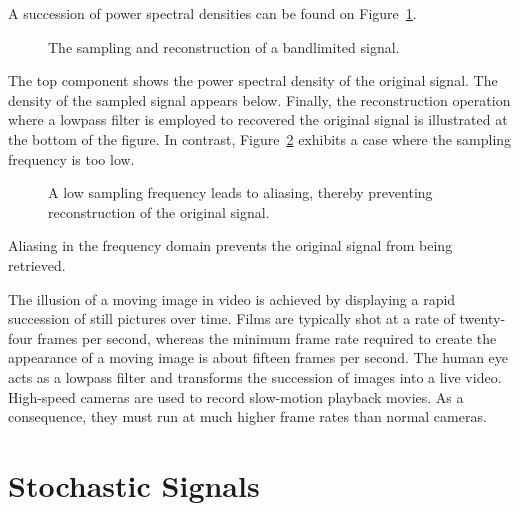 A succession of power spectral densities can be found on Figure~\ref{figure:Sampling}.
\begin{figure}[htbp]
\begin{center}
\caption{The sampling and reconstruction of a bandlimited signal.}
\label{figure:Sampling}
\end{center}
\end{figure}
The top component shows the power spectral density of the original signal.
The density of the sampled signal appears below.
Finally, the reconstruction operation where a lowpass filter is employed to recovered the original signal is illustrated at the bottom of the figure.
In contrast, Figure~\ref{figure:Aliasing} exhibits a case where the sampling frequency is too low.
\begin{figure}[htbp]
\begin{center}
\caption{A low sampling frequency leads to aliasing, thereby preventing reconstruction of the original signal.}
\label{figure:Aliasing}
\end{center}
\end{figure}
Aliasing in the frequency domain prevents the original signal from being retrieved.

The illusion of a moving image in video is achieved by displaying a rapid succession of still pictures over time.
Films are typically shot at a rate of twenty-four frames per second, whereas the minimum frame rate required to create the appearance of a moving image is about fifteen frames per second.
The human eye acts as a lowpass filter and transforms the succession of images into a live video.
High-speed cameras are used to record slow-motion playback movies.
As a consequence, they must run at much higher frame rates than normal cameras.


\section{Stochastic Signals}
\label{section:StocahsticSignalsFAS}

